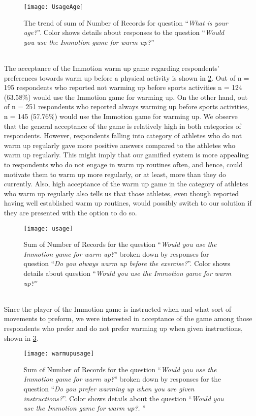 \begin{figure}[h]
    \centering
    \texttt{[image: UsageAge]}
    \caption{The trend of sum of Number of Records for question ``\textit{What is your age?}''. Color shows details about responses to the question ``\textit{Would you use the Immotion game for warm up?}''}
    \label{fig:UsageAge}
\end{figure}\\
The acceptance of the Immotion warm up game regarding respondents' preferences towards warm up before a physical activity is shown in \ref{fig:usage}. Out of n = 195 respondents who reported not warming up before sports activities n = 124 (63.58\%) would use the Immotion game for warming up. On the other hand, out of n = 251 respondents who reported always warming up before sports activities, n = 145 (57.76\%) would use the Immotion game for warming up. We observe that the general acceptance of the game is relatively high in both categories of respondents. However, respondents falling into category of athletes who do not warm up regularly gave more positive answers compared to the athletes who warm up regularly. This might imply that our gamified system is more appealing to respondents who do not engage in warm up routines often, and hence, could motivate them to warm up more regularly, or at least, more than they do currently. Also, high acceptance of the warm up game in the category of athletes who warm up regularly also tells us that those athletes, even though reported having well established warm up routines, would possibly switch to our solution if they are presented with the option to do so.  
\begin{figure}[h]
    \centering
    \texttt{[image: usage]}
    \caption{Sum of Number of Records for the question ``\textit{Would you use the Immotion game for warm up?}'' broken down by responses for question ``\textit{Do you always warm up before the exercise?}''. Color shows details about question ``\textit{Would you use the Immotion game for warm up?}''}
    \label{fig:usage}
\end{figure}\\
Since the player of the Immotion game is instructed when and what sort of movements to preform, we were interested in acceptance of the game among those respondents who prefer and do not prefer warming up when given instructions, shown in \ref{fig:warmupusage}.
\begin{figure}[h]
    \centering
    \texttt{[image: warmupusage]}
    \caption{Sum of Number of Records for the question ``\textit{Would you use the Immotion game for warm up?}'' broken down by responses for the question ``\textit{Do you prefer warming up when you are given instructions?}''. Color shows details about the question ``\textit{Would you use the Immotion game for warm up?. }''}
    \label{fig:warmupusage}
\end{figure}\\
